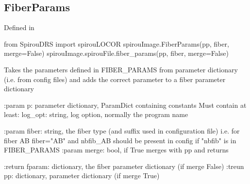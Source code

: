 \noindent\begin{minipage}{\textwidth}
\subsection{FiberParams}

Defined in \spirouImage{}

\begin{pythonbox}
from SpirouDRS import spirouLOCOR
spirouImage.FiberParams(pp, fiber, merge=False)
spirouImage.spirouFile.fiber_params(pp, fiber, merge=False)
\end{pythonbox}

\begin{pythondocstring}
Takes the parameters defined in FIBER_PARAMS from parameter dictionary
(i.e. from config files) and adds the correct parameter to a fiber
parameter dictionary

:param p: parameter dictionary, ParamDict containing constants
    Must contain at least:
            log_opt: string, log option, normally the program name

:param fiber: string, the fiber type (and suffix used in configuration file)
              i.e. for fiber AB fiber="AB" and nbfib_AB should be present
              in config if "nbfib" is in FIBER_PARAMS
:param merge: bool, if True merges with pp and returns

:return fparam: dictionary, the fiber parameter dictionary (if merge False)
:treun pp: dictionary, parameter dictionary (if merge True)
\end{pythondocstring}
\end{minipage}


